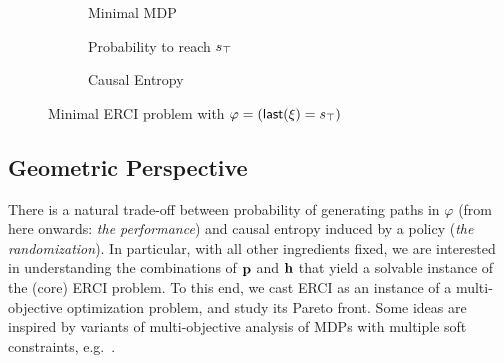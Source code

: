 \begin{figure}
\centering
\begin{subfigure}{0.24\columnwidth}
\centering
{}
\caption{Minimal MDP}
\label{fig:minimal:mdp}
\end{subfigure}
\begin{subfigure}{0.36\columnwidth}
\centering
{}
\caption{Probability to reach $s_{\top}$}
\label{fig:minimal:soft}
\end{subfigure}
\begin{subfigure}{0.36\columnwidth}
\centering
{}
\caption{Causal Entropy}
\label{fig:minimal:entropy}
\end{subfigure}

\caption{Minimal ERCI problem with $\varphi = ( \mathsf{last}({\xi}) = s_{\top} )$}
\end{figure}


\subsection{Geometric Perspective}
There is a natural trade-off
between probability of generating paths in $\varphi$ (from here
onwards: \emph{the performance}) and causal entropy induced by a
policy (\emph{the randomization}).  In particular, with all other ingredients fixed, 
we are interested in understanding the combinations of $\mathbf{p}$
and $\mathbf{h}$ that yield a solvable instance of the (core) ERCI problem. To this
end, we cast ERCI as an instance of a multi-objective optimization problem, and
study its Pareto front. Some ideas are inspired by variants of multi-objective analysis of MDPs with multiple soft constraints, e.g.~\cite{DBLP:conf/stacs/ChatterjeeMH06,DBLP:conf/tacas/EtessamiKVY07,DBLP:conf/atva/ForejtKP12}.

